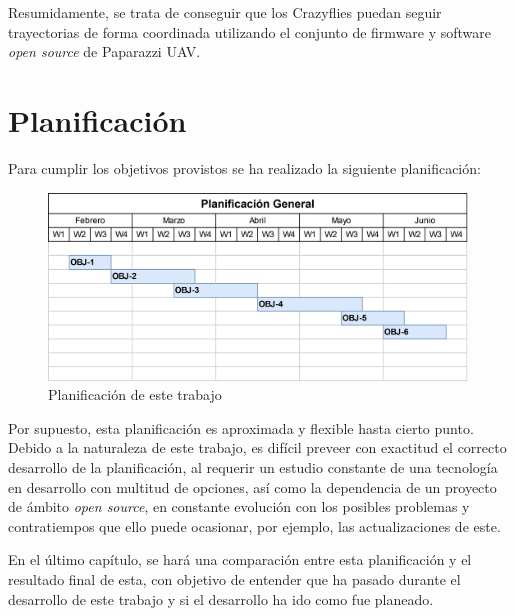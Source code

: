 Resumidamente, se trata de conseguir que los Crazyflies puedan seguir trayectorias de forma coordinada utilizando el conjunto de firmware y software \textit{open source} de Paparazzi UAV.


\section{Planificación}

Para cumplir los objetivos provistos se ha realizado la siguiente planificación:

\begin{figure}[h]
    \centering
    \includegraphics[width=0.99\textwidth]{img/fig/fig1.4-gantt.png}
    \caption{Planificación de este trabajo}
    \label{fig:gantt}
\end{figure}

Por supuesto, esta planificación es aproximada y flexible hasta cierto punto.
Debido a la naturaleza de este trabajo, es difícil preveer con exactitud el correcto desarrollo de la planificación,
al requerir un estudio constante de una tecnología en desarrollo con multitud de opciones, así como la dependencia de un proyecto de ámbito \textit{open source},
en constante evolución con los posibles problemas y contratiempos que ello puede ocasionar, por ejemplo, las actualizaciones de este.

En el último capítulo, se hará una comparación entre esta planificación y el resultado final de esta, 
con objetivo de entender que ha pasado durante el desarrollo de este trabajo
y si el desarrollo ha ido como fue planeado. 